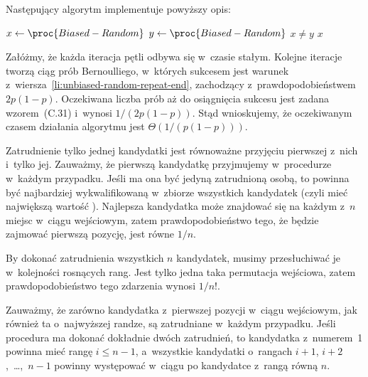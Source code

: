 Następujący algorytm implementuje powyższy opis:
\begin{codebox}
\li	\Repeat
		$x\gets\proc{Biased-Random}$
\li		$y\gets\proc{Biased-Random}$
\li	\Until $x\ne y$ \label{li:unbiased-random-repeat-end}
\li	\Return $x$
\end{codebox}

Załóżmy, że każda iteracja pętli  odbywa się w~czasie stałym. Kolejne iteracje tworzą ciąg prób Bernoulliego, w~których sukcesem jest warunek z~wiersza~\ref{li:unbiased-random-repeat-end}, zachodzący z~prawdopodobieństwem $2p(1-p)$. Oczekiwana liczba prób aż do osiągnięcia sukcesu jest zadana wzorem~(C.31) i~wynosi $1/(2p(1-p))$. Stąd wnioskujemy, że oczekiwanym czasem działania algorytmu jest $\Theta(1/(p(1-p)))$.


\exercise %
Zatrudnienie tylko jednej kandydatki jest równoważne przyjęciu pierwszej z~nich i~tylko jej. Zauważmy, że pierwszą kandydatkę przyjmujemy w~procedurze  w~każdym przypadku. Jeśli ma ona być jedyną zatrudnioną osobą, to powinna być najbardziej wykwalifikowaną w~zbiorze wszystkich kandydatek (czyli mieć największą wartość ). Najlepsza kandydatka może znajdować się na każdym z~$n$ miejsc w~ciągu wejściowym, zatem prawdopodobieństwo tego, że będzie zajmować pierwszą pozycję, jest równe $1/n$.

By dokonać zatrudnienia wszystkich $n$ kandydatek, musimy przesłuchiwać je w~kolejności rosnących rang. Jest tylko jedna taka permutacja wejściowa, zatem prawdopodobieństwo tego zdarzenia wynosi $1/n!$.

\exercise %
Zauważmy, że zarówno kandydatka z~pierwszej pozycji w~ciągu wejściowym, jak również ta o~najwyższej randze, są zatrudniane w~każdym przypadku. Jeśli procedura  ma dokonać dokładnie dwóch zatrudnień, to kandydatka z~numerem~1 powinna mieć rangę $i\le n-1$, a~wszystkie kandydatki o~rangach $i+1$, $i+2$,~\dots,~$n-1$ powinny występować w~ciągu po kandydatce z~rangą równą $n$.

